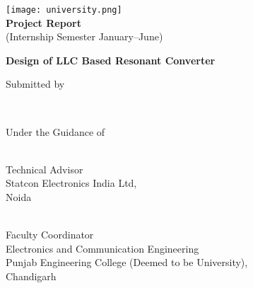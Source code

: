 \begin{titlepage}
    \begin{center}

        
        \texttt{[image: university.png]}\\
        {\textbf{Project Report}}\\
        \vspace*{0.2cm}
        (Internship Semester January--June)

        \vspace*{3cm}
        {\Large\textbf {Design of LLC Based Resonant Converter}}

        \vfill
        Submitted by

        \vfill
        \textbf{
        \name \\
        \sid
        }

        \vfill
        Under the Guidance of
    \end{center}
    \vfill

    \noindent
    
    \begin{minipage}[t]{0.4\textwidth}
        \raggedright
        \industry \\
        Technical Advisor\\
        Statcon Electronics India Ltd,\\
        Noida
    \end{minipage}
    \hfill
    \begin{minipage}[t]{0.55\textwidth}
        \raggedleft
        \faculty \\
        Faculty Coordinator\\
        Electronics and Communication Engineering\\
        Punjab Engineering College (Deemed to be University),\\
        Chandigarh
    \end{minipage}
\end{titlepage}